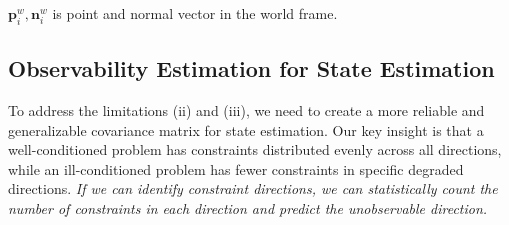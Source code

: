 $\mathbf{p}^w_i,\mathbf{n}^w_i$ is point and normal vector in the world frame. 





\subsection{Observability Estimation for State Estimation}
To address the limitations (ii) and (iii), we need to create a more reliable and generalizable covariance matrix for state estimation. Our key insight is that a well-conditioned problem has constraints distributed evenly across all directions, while an ill-conditioned problem has fewer constraints in specific degraded directions. \textit{If we can identify constraint directions, we can statistically count the number of constraints in each direction and predict the unobservable direction.} 

